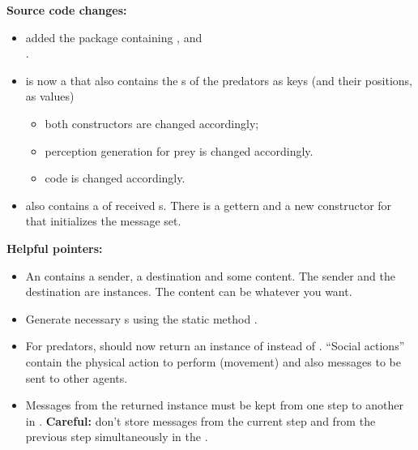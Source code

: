 \documentclass[a4paper, 12pt, twoside]{article}
\begin{document}
\clearpage%

\label{page2}

\textbf{Source code changes:} \begin{itemize}\itemsep1.5ex
	\item added the  package containing ,  and \\ .
	\item {} is now a  that also contains the s of the predators as keys (and their positions, as values)
	\begin{itemize}
		\item both  constructors are changed accordingly;
		\item perception generation for prey is changed accordingly.
		\item {} code is changed accordingly.
	\end{itemize}
	\item {} also contains a  of received s. There is a gettern and a new constructor for  that initializes the message set.
\end{itemize}


\textbf{Helpful pointers:} \begin{itemize}\itemsep1.5ex
	\item An  contains a sender, a destination and some content. The sender and the destination are  instances. The content can be whatever you want.
	\item Generate necessary s using the static method .
	\item For predators,  should now return an instance of  instead of . ``Social actions'' contain the physical action to perform (movement) and also messages to be sent to other agents.
	\item Messages from the returned  instance must be kept from one step to another in . \textbf{Careful:} don't store messages from the current step and from the previous step simultaneously in the . 
\end{itemize}


\end{document}
